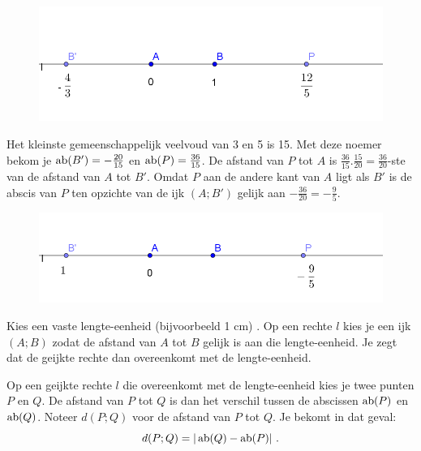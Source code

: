 \begin{figure}[ht]
\begin{center}
\includegraphics[height=3 cm]{4_opp_inhoud_an_meetk/inputs/AMTekst1Fig10}
\end{center}
\end{figure}

Het kleinste gemeenschappelijk veelvoud van 3 en 5 is 15.
Met deze noemer bekom je $\operatorname{ab} (B')=-\frac{20}{15}$ en $\operatorname{ab} (P)=\frac{36}{15}$.
De afstand van $P$ tot $A$ is $\frac{36}{15}.\frac{15}{20}=\frac{36}{20}$-ste van de afstand van $A$ tot $B'$.
Omdat $P$ aan de andere kant van $A$ ligt als $B'$ is de abscis van $P$ ten opzichte van de ijk $(A;B')$ gelijk aan $-\frac{36}{20}=-\frac{9}{5}$.

\begin{figure}[h]
\begin{center}
\includegraphics[height=3 cm]{4_opp_inhoud_an_meetk/inputs/AMTekst1Fig11}
\end{center}
\end{figure}

Kies een vaste lengte-eenheid (bijvoorbeeld 1 cm) .
Op een rechte $l$ kies je een ijk $(A;B)$ zodat de afstand van $A$ tot $B$ gelijk is aan die lengte-eenheid.
Je zegt dat de geijkte rechte dan overeenkomt met de lengte-eenheid.

Op een geijkte rechte $l$ die overeenkomt met de lengte-eenheid kies je twee punten $P$ en $Q$.
De afstand van $P$ tot $Q$ is dan het verschil tussen de abscissen $\operatorname{ab} (P)$ en $\operatorname{ab} (Q)$.
Noteer $d(P;Q)$ voor de afstand van $P$ tot $Q$.
Je bekomt in dat geval:
\[
d(P;Q)=\vert \operatorname{ab} (Q) - \operatorname{ab} (P) \vert \text { .}
\]

